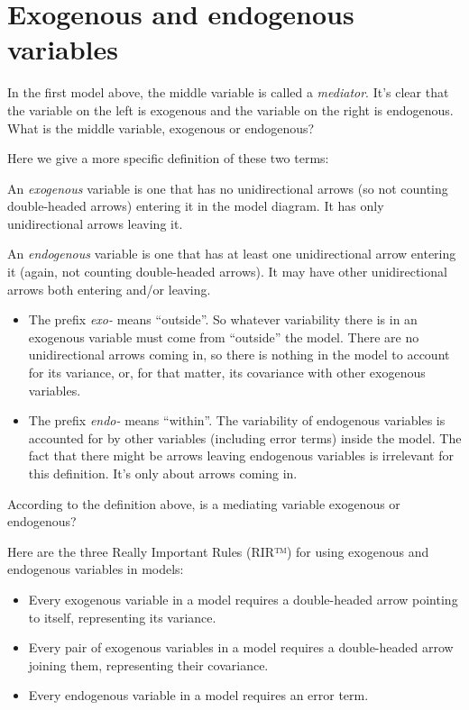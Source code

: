 \documentclass[
]{book}
\begin{document}
\hypertarget{mediation-exogenous-endogenous}{%
\section{Exogenous and endogenous variables}\label{mediation-exogenous-endogenous}}

In the first model above, the middle variable is called a \emph{mediator}. It's clear that the variable on the left is exogenous and the variable on the right is endogenous. What is the middle variable, exogenous or endogenous?

Here we give a more specific definition of these two terms:

An \emph{exogenous} variable is one that has no unidirectional arrows (so not counting double-headed arrows) entering it in the model diagram. It has only unidirectional arrows leaving it.

An \emph{endogenous} variable is one that has at least one unidirectional arrow entering it (again, not counting double-headed arrows). It may have other unidirectional arrows both entering and/or leaving.

\begin{itemize}
\item
  The prefix \emph{exo-} means ``outside''. So whatever variability there is in an exogenous variable must come from ``outside'' the model. There are no unidirectional arrows coming in, so there is nothing in the model to account for its variance, or, for that matter, its covariance with other exogenous variables.
\item
  The prefix \emph{endo-} means ``within''. The variability of endogenous variables is accounted for by other variables (including error terms) inside the model. The fact that there might be arrows leaving endogenous variables is irrelevant for this definition. It's only about arrows coming in.
\end{itemize}

According to the definition above, is a mediating variable exogenous or endogenous?

Here are the three Really Important Rules (RIR™) for using exogenous and endogenous variables in models:

\begin{itemize}
\item
  Every exogenous variable in a model requires a double-headed arrow pointing to itself, representing its variance.
\item
  Every pair of exogenous variables in a model requires a double-headed arrow joining them, representing their covariance.
\item
  Every endogenous variable in a model requires an error term.
\end{itemize}
\end{document}
